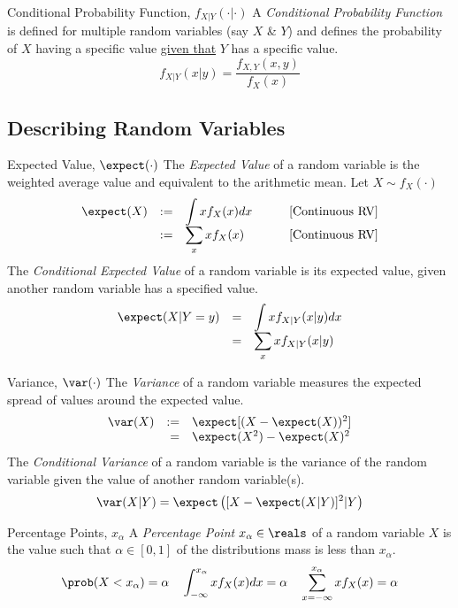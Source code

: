 \documentclass[11pt,a4paper]{article}
\begin{document}
\begin{definition}{Conditional Probability Function, $f_{X|Y}(\cdot|\cdot)$}
A \textit{Conditional Probability Function} is defined for multiple random variables (say $X$ \& $Y$) and defines the probability of $X$ having a specific value \underline{given that} $Y$ has a specific value.
\[ f_{X|Y}(x|y)=\frac{f_{X,Y}(x,y)}{f_X(x)} \]
\end{definition}

\subsection{Describing Random Variables}

\begin{definition}{Expected Value, $\expect(\cdot)$}
The \textit{Expected Value} of a random variable is the weighted average value and equivalent to the arithmetic mean. Let $X\sim f_X(\cdot)$
\[
\begin{array}{rclcl}
\expect(X)&:=&\displaystyle\int xf_X(x)dx&\quad&\text{[Continuous RV]}\\
&:=&\displaystyle\sum_x xf_X(x)&\quad&\text{[Continuous RV]}
\end{array}
\]
The \textit{Conditional Expected Value} of a random variable is its expected value, given another random variable has a specified value.
\[\begin{array}{rcl}
\expect(X|Y=y)&=&\displaystyle\int xf_{X|Y}(x|y)dx\\
&=&\displaystyle\sum_x xf_{X|Y}(x|y)
\end{array}\]
\end{definition}

\begin{definition}{Variance, $\var(\cdot)$}
The \textit{Variance} of a random variable measures the expected spread of values around the expected value.
\[\begin{array}{rrl}
\var(X)&:=&\expect[(X-\expect(X))^2]\\
&=&\expect(X^2)-\expect(X)^2
\end{array}\]
The \textit{Conditional Variance} of a random variable is the variance of the random variable given the value of another random variable(s).
\[ \var(X|Y)=\expect\left([X-\expect(X|Y)]^2|Y\right) \]
\end{definition}

\begin{definition}{Percentage Points, $x_\alpha$}
  A \textit{Percentage Point} $x_\alpha\in\reals$ of a random variable $X$ is the value such that $\alpha\in[0,1]$ of the distributions mass is less than $x_\alpha$.
  \[ \prob(X<x_\alpha)=\alpha\quad\int_{-\infty}^{x_\alpha}xf_X(x)dx=\alpha\quad\sum_{x=-\infty}^{x_\alpha}xf_X(x)=\alpha \]
\end{definition}
\end{document}

